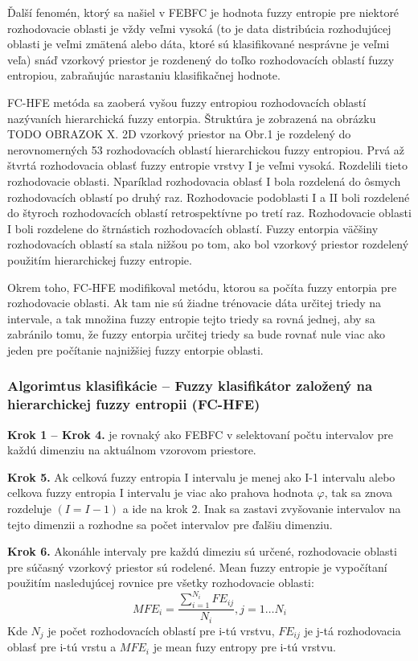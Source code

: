 Ďalší fenomén, ktorý sa našiel v FEBFC je hodnota fuzzy entropie pre niektoré rozhodovacie oblasti je vždy veľmi vysoká (to je data distribúcia rozhodujúcej oblasti je veľmi zmätená alebo dáta, ktoré sú klasifikované nesprávne je veľmi veľa) snáď vzorkový priestor je rozdenený do toľko rozhodovacích oblastí fuzzy entropiou, zabraňujúc narastaniu klasifikačnej hodnote. 

FC-HFE  metóda sa zaoberá vyšou fuzzy entropiou rozhodovacích oblastí nazývaních hierarchická fuzzy entorpia. Štruktúra je zobrazená na obrázku TODO OBRAZOK X. 2D vzorkový priestor na Obr.1 je rozdelený do nerovnomerných 53 rozhodovacích oblastí hierarchickou fuzzy entropiou. Prvá až štvrtá rozhodovacia oblasť fuzzy entropie vrstvy I je veľmi vysoká. Rozdelili tieto rozhodovacie oblasti. Nparíklad rozhodovacia oblasť I bola rozdelená do ôsmych rozhodovacích oblastí po druhý raz. Rozhodovacie podoblasti I a II boli rozdelené do štyroch rozhodovacích oblastí retrospektívne po tretí raz. Rozhodovacie oblasti I boli rozdelene do štrnástich rozhodovacích oblastí. Fuzzy entorpia väčšiny rozhodovacích oblastí sa stala nižšou po tom, ako bol vzorkový priestor rozdelený použitím hierarchickej fuzzy entropie. 

Okrem toho, FC-HFE modifikoval metódu, ktorou sa počíta fuzzy entorpia pre rozhodovacie oblasti. Ak tam nie sú žiadne trénovacie dáta určitej triedy na intervale, a tak množina fuzzy entropie tejto triedy sa rovná jednej, aby sa zabránilo tomu, že fuzzy entorpia určitej triedy sa bude rovnať nule viac ako jeden pre počítanie najnižšiej fuzzy entorpie oblasti. 

\subsubsection{Algorimtus klasifikácie – Fuzzy klasifikátor založený na hierarchickej fuzzy entropii (FC-HFE)}

\textbf{Krok 1 – Krok 4.} je rovnaký ako FEBFC v selektovaní počtu intervalov pre každú dimenziu na aktuálnom vzorovom priestore. 

\textbf{Krok 5.} Ak celková fuzzy entropia I intervalu je menej ako I-1 intervalu alebo celkova fuzzy entropia I intervalu je viac ako prahova hodnota $\varphi$, tak sa znova rozdeluje $(I = I - 1)$ a ide na krok 2. Inak sa zastavi zvyšovanie intervalov na tejto dimenzii a rozhodne sa počet intervalov pre ďalšiu dimenziu. 

\textbf{Krok 6.} Akonáhle intervaly pre každú dimeziu sú určené, rozhodovacie oblasti pre súčasný vzorkový priestor sú rodelené. Mean fuzzy entropie je vypočítaní použitím nasledujúcej rovnice pre všetky rozhodovacie oblasti: 
$$MFE_i =  \frac{\sum\limits_{i=1}^{N_i}FE_{ij}}{ N_i},  j=1…N_i$$
Kde $N_j$ je počet rozhodovacích oblastí pre i-tú vrstvu, $FE_{ij}$ je j-tá rozhodovacia oblasť pre i-tú vrstu a $MFE_i$ je mean fuzy entropy pre i-tú vrstvu. 

